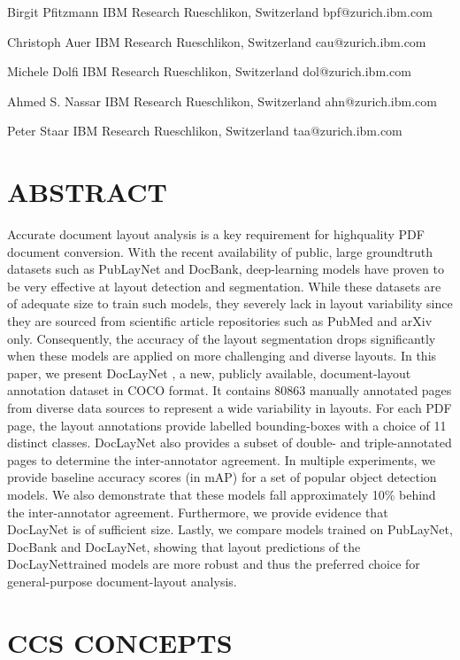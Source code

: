 \documentclass[11pt,a4paper]{article}
\begin{document}
Birgit Pfitzmann IBM Research Rueschlikon, Switzerland bpf@zurich.ibm.com

Christoph Auer IBM Research Rueschlikon, Switzerland cau@zurich.ibm.com

Michele Dolfi IBM Research Rueschlikon, Switzerland dol@zurich.ibm.com

Ahmed S. Nassar IBM Research Rueschlikon, Switzerland ahn@zurich.ibm.com

Peter Staar IBM Research Rueschlikon, Switzerland taa@zurich.ibm.com

\section{ABSTRACT}

Accurate document layout analysis is a key requirement for highquality PDF document conversion. With the recent availability of public, large groundtruth datasets such as PubLayNet and DocBank, deep-learning models have proven to be very effective at layout detection and segmentation. While these datasets are of adequate size to train such models, they severely lack in layout variability since they are sourced from scientific article repositories such as PubMed and arXiv only. Consequently, the accuracy of the layout segmentation drops significantly when these models are applied on more challenging and diverse layouts. In this paper, we present DocLayNet , a new, publicly available, document-layout annotation dataset in COCO format. It contains 80863 manually annotated pages from diverse data sources to represent a wide variability in layouts. For each PDF page, the layout annotations provide labelled bounding-boxes with a choice of 11 distinct classes. DocLayNet also provides a subset of double- and triple-annotated pages to determine the inter-annotator agreement. In multiple experiments, we provide baseline accuracy scores (in mAP) for a set of popular object detection models. We also demonstrate that these models fall approximately 10\% behind the inter-annotator agreement. Furthermore, we provide evidence that DocLayNet is of sufficient size. Lastly, we compare models trained on PubLayNet, DocBank and DocLayNet, showing that layout predictions of the DocLayNettrained models are more robust and thus the preferred choice for general-purpose document-layout analysis.

\section{CCS CONCEPTS}
\end{document}
